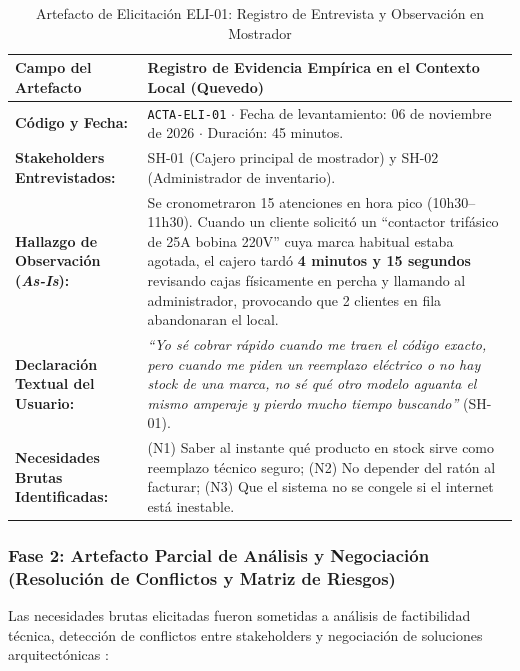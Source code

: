 \begin{table}[htbp]
\centering
\scriptsize
\caption{Artefacto de Elicitación ELI-01: Registro de Entrevista y Observación en Mostrador}
\label{tab:artefacto_elicitacion}
\begin{tabularx}{\textwidth}{l Y}
\toprule
\textbf{Campo del Artefacto} & \textbf{Registro de Evidencia Empírica en el Contexto Local (Quevedo)} \\
\midrule
\textbf{Código y Fecha:} & \texttt{ACTA-ELI-01} $\cdot$ Fecha de levantamiento: 06 de noviembre de 2026 $\cdot$ Duración: 45 minutos. \\
\textbf{Stakeholders Entrevistados:} & SH-01 (Cajero principal de mostrador) y SH-02 (Administrador de inventario). \\
\textbf{Hallazgo de Observación (\textit{As-Is}):} & Se cronometraron 15 atenciones en hora pico (10h30--11h30). Cuando un cliente solicitó un ``contactor trifásico de 25A bobina 220V'' cuya marca habitual estaba agotada, el cajero tardó \textbf{4 minutos y 15 segundos} revisando cajas físicamente en percha y llamando al administrador, provocando que 2 clientes en fila abandonaran el local. \\
\textbf{Declaración Textual del Usuario:} & \textit{``Yo sé cobrar rápido cuando me traen el código exacto, pero cuando me piden un reemplazo eléctrico o no hay stock de una marca, no sé qué otro modelo aguanta el mismo amperaje y pierdo mucho tiempo buscando''} (SH-01). \\
\textbf{Necesidades Brutas Identificadas:} & (N1) Saber al instante qué producto en stock sirve como reemplazo técnico seguro; (N2) No depender del ratón al facturar; (N3) Que el sistema no se congele si el internet está inestable. \\
\bottomrule
\end{tabularx}
\end{table}

\subsubsection{Fase 2: Artefacto Parcial de Análisis y Negociación (Resolución de Conflictos y Matriz de Riesgos)}
Las necesidades brutas elicitadas fueron sometidas a análisis de factibilidad técnica, detección de conflictos entre stakeholders y negociación de soluciones arquitectónicas \cite{swebok2024, ireb2023}:

